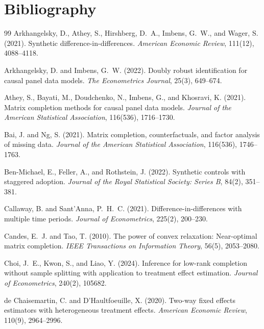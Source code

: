 \documentclass[11pt]{article}
\theoremstyle{definition}
\theoremstyle{plain}
\theoremstyle{remark}
\begin{document}
\section*{Bibliography}
\begin{thebibliography}{99}
Arkhangelsky, D., Athey, S., Hirshberg, D.~A., Imbens, G.~W., and Wager, S. (2021).
Synthetic difference-in-differences.
\emph{American Economic Review}, 111(12), 4088--4118.

Arkhangelsky, D. and Imbens, G.~W. (2022).
Doubly robust identification for causal panel data models.
\emph{The Econometrics Journal}, 25(3), 649--674.

Athey, S., Bayati, M., Doudchenko, N., Imbens, G., and Khosravi, K. (2021).
Matrix completion methods for causal panel data models.
\emph{Journal of the American Statistical Association}, 116(536), 1716--1730.

Bai, J. and Ng, S. (2021).
Matrix completion, counterfactuals, and factor analysis of missing data.
\emph{Journal of the American Statistical Association}, 116(536), 1746--1763.

Ben-Michael, E., Feller, A., and Rothstein, J. (2022).
Synthetic controls with staggered adoption.
\emph{Journal of the Royal Statistical Society: Series B}, 84(2), 351--381.

Callaway, B. and Sant'Anna, P.~H.~C. (2021).
Difference-in-differences with multiple time periods.
\emph{Journal of Econometrics}, 225(2), 200--230.

Candes, E.~J. and Tao, T. (2010).
The power of convex relaxation: Near-optimal matrix completion.
\emph{IEEE Transactions on Information Theory}, 56(5), 2053--2080.

Choi, J.~E., Kwon, S., and Liao, Y. (2024).
Inference for low-rank completion without sample splitting with application to treatment effect estimation.
\emph{Journal of Econometrics}, 240(2), 105682.

de Chaisemartin, C. and D'Haultfoeuille, X. (2020).
Two-way fixed effects estimators with heterogeneous treatment effects.
\emph{American Economic Review}, 110(9), 2964--2996.


\end{thebibliography}
\end{document}
